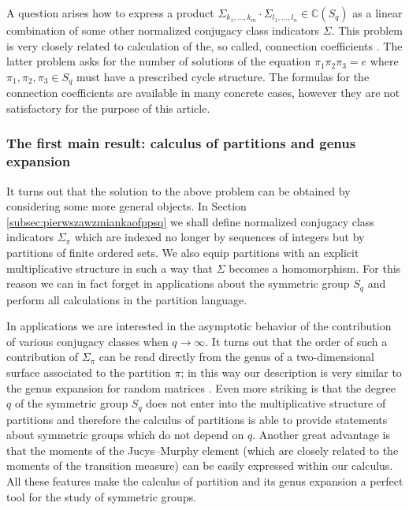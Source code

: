 \documentclass[12pt,dvips]{amsart}
\numberwithin{equation}{section} \numberwithin{figure}{section}
\theoremstyle{plain}
\theoremstyle{definition}
\theoremstyle{remark}
\newcommand{\C}{{\mathbb{C}}}
\newcommand{\Sn}[1]{{{S}}_{#1}}
\begin{document}
A question arises how to express a product
$\Sigma_{k_1,\dots,k_m}\cdot \Sigma_{l_1,\dots,l_n} \in \C(\Sn{q})$
as a linear combination of some other normalized conjugacy class
indicators $\Sigma$. This problem is very closely related to
calculation of the, so called, connection coefficients
\cite{GouldenJackson1996connection,GouldenJacksonLatour,
Goupil1990,Goupil1994,GoupilSchaeffer1998}. The latter problem asks
for the number of solutions of the equation $\pi_1 \pi_2 \pi_3=e$
where $\pi_1,\pi_2,\pi_3\in \Sn{q}$ must have a prescribed cycle
structure. The formulas for the connection coefficients are
available in many concrete cases, however they are not satisfactory
for the purpose of this article.

\subsubsection{The first main result: calculus of partitions and genus expansion}
It turns out that the solution to the above problem can be obtained
by considering some more general objects. In Section
\ref{subsec:pierwszawzmiankaofppsq} we shall define normalized
conjugacy class indicators $\Sigma_{\pi}$ which are indexed no
longer by sequences of integers but by partitions of finite ordered
sets. We also equip partitions with an explicit multiplicative
structure in such a way that $\Sigma$ becomes a homomorphism. For
this reason we can in fact forget in applications about the
symmetric group $\Sn{q}$ and perform all calculations in the
partition language.

In applications we are interested in the asymptotic behavior of the
contribution of various conjugacy classes when $q\to\infty$. It
turns out that the order of such a contribution of $\Sigma_{\pi}$
can be read directly from the genus of a two-dimensional surface
associated to the partition $\pi$; in this way our description is
very similar to the genus expansion for random matrices
\cite{Zvonkin1995matrixintegrals}. Even more striking is that the
degree $q$ of the symmetric group $\Sn{q}$ does not enter into the
multiplicative structure of partitions and therefore the calculus of
partitions is able to provide statements about symmetric groups
which do not depend on $q$. Another great advantage is that the
moments of the Jucys--Murphy element (which are closely related to
the moments of the transition measure) can be easily expressed
within our calculus.
All these features make the calculus of partition and its genus
expansion a perfect tool for the study of symmetric groups.
\end{document}
